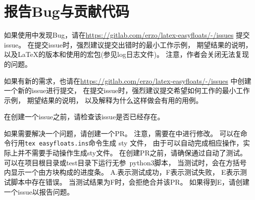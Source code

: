 
\section{报告Bug与贡献代码}
\label{bug-reports-and-contributions}

如果使用中发现Bug，请在\url{https://gitlab.com/erzo/latex-easyfloats/-/issues}
提交issue。
在提交issue时，强烈建议提交出错时的最小工作示例，
期望结果的说明，
以及\LaTeX{}的版本和使用的宏包(参见log日志文件)。
注意，作者会关闭无法复现的问题。


如果有新的需求，也请在\url{https://gitlab.com/erzo/latex-easyfloats/-/issues}
中创建一个新的issue进行提交，
在提交issue时，强烈建议提交希望如何工作的最小工作示例，
期望结果的说明，
以及解释为什么这样做会有用的用例。

在创建一个issue之前，请检查该issue是否已经存在。

如果需要解决一个问题，请创建一个PR。
注意，需要在中进行修改。
可以在命令行用\verb|tex easyfloats.ins|命令生成 sty 文件，
由于可以自动完成相应操作，实际上并不需要手动操作生成sty文件。
在创建PR之前，请确保通过自动了测试。
可以在项目根目录或test目录下运行无参\ python3脚本，
当测试时，会在方括号内显示一个由方块构成的进度条。
A.表示测试成功，F表示测试失败，
E表示测试脚本中存在错误。
当测试结果为F时，会拒绝合并该PR。
如果得到E，请创建一个issue以报告问题。

